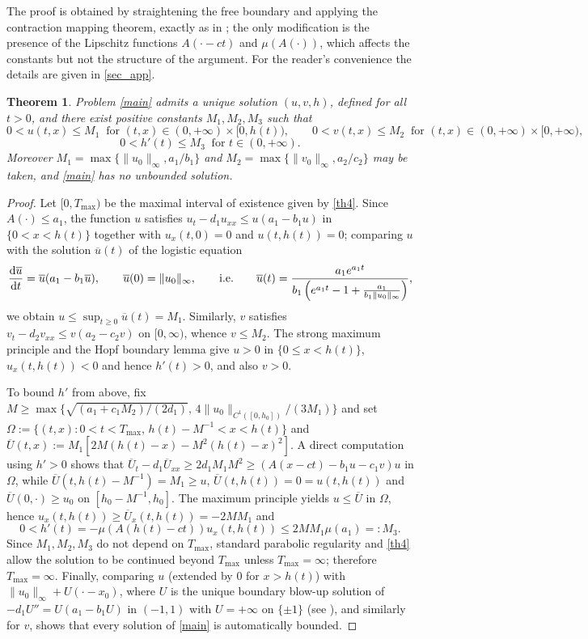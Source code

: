 \documentclass[reqno]{amsart}
\theoremstyle{plain}
\newtheorem{theorem}{Theorem}
\theoremstyle{definition}
\theoremstyle{remark}
\begin{document}
The proof is obtained by straightening the free boundary and applying the
contraction mapping theorem, exactly as in \cite[Theorem 2.1]{MR3327894}; the
only modification is the presence of the Lipschitz functions $A(\cdot-ct)$ and
$\mu(A(\cdot))$, which affects the constants but not the structure of the
argument. For the reader's convenience the details are given in \cref{sec_app}.

\begin{theorem}\label{th6}
	Problem \eqref{main} admits a unique solution $(u,v,h)$, defined for all
	$t>0$, and there exist positive constants $M_1,M_2,M_3$ such that
	\[
	0 < u(t,x) \leq M_1 \ \text{ for } (t, x) \in (0, +\infty) \times [0, h(t)),\qquad
	0 < v(t,x) \leq M_2 \ \text{ for } (t, x) \in (0, +\infty) \times [0, +\infty),
	\]
	\[
	0 < h'(t) \leq M_3 \ \text{ for } t \in (0,+\infty).
	\]
	Moreover $M_1=\max\{\|u_0\|_\infty,a_1/b_1\}$ and
	$M_2=\max\{\|v_0\|_\infty,a_2/c_2\}$ may be taken, and \eqref{main} has no
	unbounded solution.
\end{theorem}

\begin{proof}
	Let $[0,T_{\max})$ be the maximal interval of existence given by \cref{th4}.
	Since $A(\cdot)\le a_1$, the function $u$ satisfies
	$u_t-d_1u_{xx}\le u(a_1-b_1u)$ in $\{0<x<h(t)\}$ together with
	$u_x(t,0)=0$ and $u(t,h(t))=0$; comparing $u$ with the solution
	$\overline{u}(t)$ of the logistic equation
	\[
	\frac{{\rm d}\overline{u}}{{\rm d}t} = \overline{u}(a_1 - b_1\overline{u}),
	\qquad \overline{u}(0)=\|u_0\|_\infty,
	\qquad\text{i.e.}\qquad
	\overline{u}(t)=\frac{a_1e^{a_1t}}{b_1\left(e^{a_1t}-1+\frac{a_1}{b_1\|u_0\|_\infty}\right)},
	\]
	we obtain $u\le \sup_{t\ge0}\overline{u}(t)=M_1$. Similarly, $v$ satisfies
	$v_t-d_2v_{xx}\le v(a_2-c_2v)$ on $[0,\infty)$, whence $v\le M_2$. The strong
	maximum principle and the Hopf boundary lemma give $u>0$ in
	$\{0\le x<h(t)\}$, $u_x(t,h(t))<0$ and hence $h'(t)>0$, and also $v>0$.

	To bound $h'$ from above, fix $M\ge\max\{\sqrt{(a_1+c_1M_2)/(2d_1)},\,
	4\|u_0\|_{C^1([0,h_0])}/(3M_1)\}$ and set
	$\Omega:=\{(t,x):0<t<T_{\max},\,h(t)-M^{-1}<x<h(t)\}$ and
	$\overline{U}(t,x):=M_1[2M(h(t)-x)-M^2(h(t)-x)^2]$. A direct computation using
	$h'>0$ shows that $\overline{U}_t-d_1\overline{U}_{xx}\ge2d_1M_1M^2\ge
	(A(x-ct)-b_1u-c_1v)u$ in $\Omega$, while
	$\overline{U}(t,h(t)-M^{-1})=M_1\ge u$, $\overline{U}(t,h(t))=0=u(t,h(t))$ and
	$\overline{U}(0,\cdot)\ge u_0$ on $[h_0-M^{-1},h_0]$. The maximum principle
	yields $u\le\overline{U}$ in $\Omega$, hence
	$u_x(t,h(t))\ge\overline{U}_x(t,h(t))=-2MM_1$ and
	\[
	0<h'(t)=-\mu(A(h(t)-ct))u_x(t,h(t))\le 2MM_1\mu(a_1)=:M_3 .
	\]
	Since $M_1,M_2,M_3$ do not depend on $T_{\max}$, standard parabolic
	regularity and \cref{th4} allow the solution to be continued beyond
	$T_{\max}$ unless $T_{\max}=\infty$; therefore $T_{\max}=\infty$. Finally,
	comparing $u$ (extended by $0$ for $x>h(t)$) with $\|u_0\|_\infty+U(\cdot-x_0)$,
	where $U$ is the unique boundary blow-up solution of $-d_1U''=U(a_1-b_1U)$ in
	$(-1,1)$ with $U=+\infty$ on $\{\pm1\}$ (see \cite{DU_MA_2001}), and similarly
	for $v$, shows that every solution of \eqref{main} is automatically bounded.
\end{proof}
\end{document}
